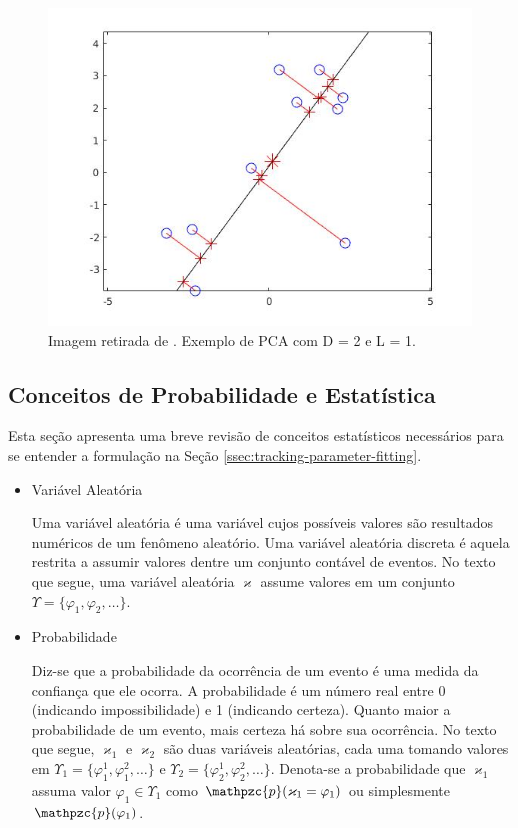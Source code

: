 {\begin{figure}[!htb]
    \centering
    \includegraphics[width=0.8\linewidth]{./figs/pcaDemo.jpg}
% 
    \caption{Imagem retirada de \cite{machine-learning-book}. Exemplo de PCA com D = 2 e L = 1.}
    \label{fig:PCA}
\end{figure}





\subsection{Conceitos de Probabilidade e Estatística}
\label{ssec:review-probabilidade}

Esta seção apresenta uma breve revisão de conceitos estatísticos necessários
para se entender a formulação na Seção \ref{ssec:tracking-parameter-fitting}.

\begin{itemize}

\item Variável Aleatória

Uma variável aleatória é uma variável cujos possíveis valores são resultados
numéricos de um fenômeno aleatório. Uma variável aleatória discreta é aquela
restrita a assumir valores dentre um conjunto contável de eventos. No texto que
segue, uma variável aleatória $\varkappa$ assume valores em um conjunto
$\Upsilon = \{\varphi_1, \varphi_2, \ldots\}$.

\item Probabilidade

Diz-se que a probabilidade da ocorrência de um evento é uma medida da confiança
que ele ocorra. A probabilidade é um número real entre 0 (indicando
impossibilidade) e 1 (indicando certeza). Quanto maior a probabilidade de um
evento, mais certeza há sobre sua ocorrência. No texto que segue, $\varkappa_1$
e $\varkappa_2$ são duas variáveis aleatórias, cada uma tomando valores em
$\Upsilon _1 = \{\varphi_1^1, \varphi_1^2, \ldots\}$ e $\Upsilon_2 =
\{\varphi_2^1, \varphi_2^2, \ldots\}$. Denota-se a probabilidade que
$\varkappa_1$ assuma valor $\varphi_1 \in \Upsilon_1$ como
$\mathpzc{p}(\varkappa_1 = \varphi_1)$ ou simplesmente $\mathpzc{p}(\varphi_1)$.


\end{itemize}}
